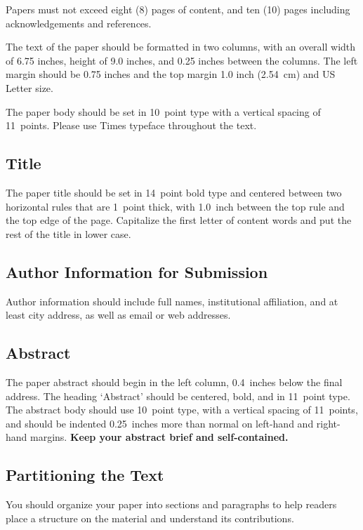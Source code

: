 \documentclass{article}
\begin{document}
Papers must not exceed eight (8) pages of content, and ten (10) pages including 
acknowledgements and references.

The text of the paper should be formatted in two columns, with an
overall width of 6.75 inches, height of 9.0 inches, and 0.25 inches
between the columns. The left margin should be 0.75 inches and the top
margin 1.0 inch (2.54~cm) and US Letter size.

The paper body should be set in 10~point type with a vertical spacing
of 11~points. Please use Times typeface throughout the text.

\subsection{Title}

The paper title should be set in 14~point bold type and centered
between two horizontal rules that are 1~point thick, with 1.0~inch
between the top rule and the top edge of the page. Capitalize the
first letter of content words and put the rest of the title in lower
case.

\subsection{Author Information for Submission}
\label{author info}

Author information should include full names, institutional affiliation,
and at least city address, as well as email or web addresses.

\subsection{Abstract}

The paper abstract should begin in the left column, 0.4~inches below
the final address. The heading `Abstract' should be centered, bold,
and in 11~point type. The abstract body should use 10~point type, with
a vertical spacing of 11~points, and should be indented 0.25~inches
more than normal on left-hand and right-hand margins. 
\textbf{Keep your abstract brief and self-contained.}

\subsection{Partitioning the Text} 

You should organize your paper into sections and paragraphs to help
readers place a structure on the material and understand its
contributions.
\end{document}
